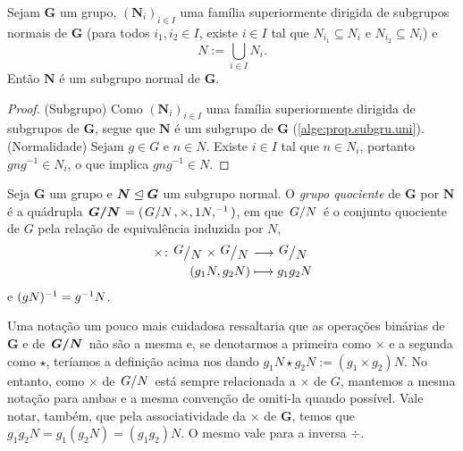 \begin{proposition}
\label{alge:prop.subgrunor.uni}
Sejam $\bm G$ um grupo, $(\bm N_i)_{i \in I}$ uma família superiormente dirigida de subgrupos normais de $\bm G$ (para todos $i_1,i_2 \in I$, existe $i \in I$ tal que $N_{i_1} \subseteq N_i$ e $N_{i_2} \subseteq N_i$) e
	\begin{equation*}
	N := \bigcup_{i \in I} N_i.
	\end{equation*}
Então $\bm N$ é um subgrupo normal de $\bm G$.
\end{proposition}
\begin{proof}
(Subgrupo) Como $(\bm N_i)_{i \in I}$ uma família superiormente dirigida de subgrupos de $\bm G$, segue que $\bm N$ é um subgrupo de $\bm G$ (\ref{alge:prop.subgru.uni}).
(Normalidade) Sejam $g \in G$ e $n \in N$. Existe $i \in I$ tal que $n \in N_i$, portanto $gng^{-1} \in N_i$, o que implica $gng^{-1} \in N$.
\end{proof}

\begin{definition}
Seja $\bm G$ um grupo e $\bm N \mathrel{\unlhd} \bm G$ um subgrupo normal. O \emph{grupo quociente} de $\bm G$ por $\bm N$ é a quádrupla $\bm{\quo{G}{N}}=(\quo{G}{N},\times,1 N,\inv)$, em que $\quo{G}{N}$ é o conjunto quociente de $G$ pela relação de equivalência induzida por $N$,
	\begin{align*}
	\func{\times}{\quo{G}{N} \times \quo{G}{N}}{\quo{G}{N}}{(g_1N,g_2N)}{g_1g_2N}
	\end{align*}
e $(gN)^{-1}=g^{-1} N$.
\end{definition}

Uma notação um pouco mais cuidadosa ressaltaria que as operações binárias de $\bm G$ e de $\bm{\quo{G}{N}}$ não são a mesma e, se denotarmos a primeira como $\times$ e a segunda como $\star$, teríamos a definição acima nos dando $g_1N \star g_2N := (g_1 \times g_2)N$. No entanto, como $\times$ de $\quo{G}{N}$ está sempre relacionada a $\times$ de $G$, mantemos a mesma notação para ambas e a mesma convenção de omiti-la quando possível. Vale notar, também, que pela associatividade da $\times$ de $\bm G$, temos que $g_1g_2N=g_1(g_2N)=(g_1g_2)N$. O mesmo vale para a inversa $\div$.


